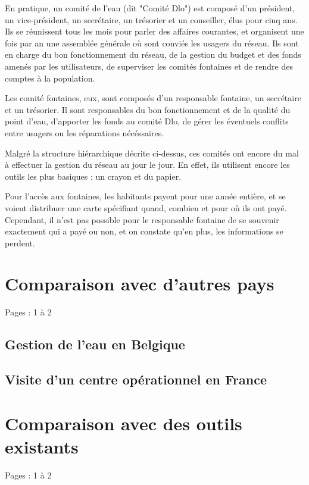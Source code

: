 \documentclass{eplmastersthesis_FR}
\begin{document}
			En pratique, un comité de l'eau (dit "Comité Dlo") est composé d'un président, un vice-président, un secrétaire, un trésorier et un conseiller, élus pour cinq ans. Ils se réunissent tous les mois pour parler des affaires courantes, et organisent une fois par an une assemblée générale où sont conviés les usagers du réseau. Ils sont en charge du bon fonctionnement du réseau, de la gestion du budget et des fonds amenés par les utilisateurs, de superviser les comités fontaines et de rendre des comptes à la population.

			Les comité fontaines, eux, sont composés d'un responsable fontaine, un secrétaire et un trésorier. Il sont responsables du bon fonctionnement et de la qualité du point d'eau, d'apporter les fonds au comité Dlo, de gérer les éventuels conflits entre usagers ou les réparations nécéssaires.

			Malgré la structure hiérarchique décrite ci-dessus, ces comités ont encore du mal à effectuer la gestion du réseau au jour le jour. En effet, ils utilisent encore les outils les plus basiques : un crayon et du papier. 

			Pour l'accès aux fontaines, les habitants payent pour une année entière, et se voient distribuer une carte spécifiant quand, combien et pour où ils ont payé. Cependant, il n'est pas possible pour le responsable fontaine de se souvenir exactement qui a payé ou non, et on constate qu'en plus, les informations se perdent.


		\section{Comparaison avec d'autres pays}

			Pages : 1 à 2

			\subsection*{Gestion de l'eau en Belgique}
			\subsection*{Visite d'un centre opérationnel en France}

		\section{Comparaison avec des outils existants}

			Pages : 1 à 2
\end{document}
